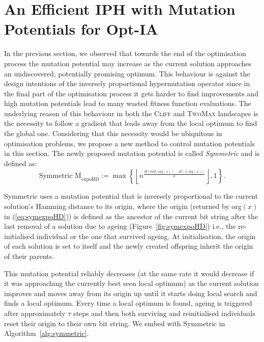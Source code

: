 \documentclass[lettersize,journal]{IEEEtran}
\begin{document}

\section{An Efficient IPH with Mutation Potentials for Opt-IA} \label{sec:FCMsymmetric}
In the previous section, we observed that towards the end of the optimisation process the mutation potential may increase as the current solution approaches an undiscovered, potentially promising optimum. This behaviour is against the design intentions of the inversely proportional hypermutation operator since in the final part of the optimisation process it gets harder to find improvements and high mutation potentials lead to many wasted fitness function evaluations.
The underlying reason of this behaviour in both the \textsc{Cliff} and \textsc{TwoMax} landscapes is the necessity to follow a gradient that leads away from the local optimum to find the global one. Considering that this necessity would be ubiquitous in optimisation problems, we propose a new method to control mutation potentials in this section. The newly proposed mutation potential is called {\it Symmetric \expoHD} and is defined as:
\begin{equation} \label{eq:symexpoHD}
\text{Symmetric M}_{\text{expoHD}}:= \max \left\{\left\lfloor  
n^{\frac{H(\text{best},\text{org}(x))-H(x,\text{org}(x))}{n}} \right\rfloor , 1\right\}.
\end{equation}

Symmetric \expoHD{} uses a mutation potential that is inversely proportional to the current solution's Hamming distance to its origin, where the origin (returned by org$(x)$ in (\ref{eq:symexpoHD})) is defined as the ancestor of the current bit string after the last removal of a solution due to ageing (Figure~\ref{fig:symexpoHD}) i.e., the re-initialised individual or the one that survived ageing.  At initialisation, the origin of each solution is set to itself and the newly created offspring inherit the origin of their parents. 


This mutation potential reliably decreases (at the same rate it would decrease if it was approaching the currently best seen local optimum) as the current solution improves and moves away from its origin up until it starts doing local search and finds a local optimum. Every time a local optimum is found, ageing is triggered after approximately $\tau$ steps and then both surviving and reinitialised individuals reset their origin to their own bit string. We   embed \IPHfcm{} with Symmetric \expoHD{} in Algorithm~\ref{alg:symmetric}. %
\end{document}
